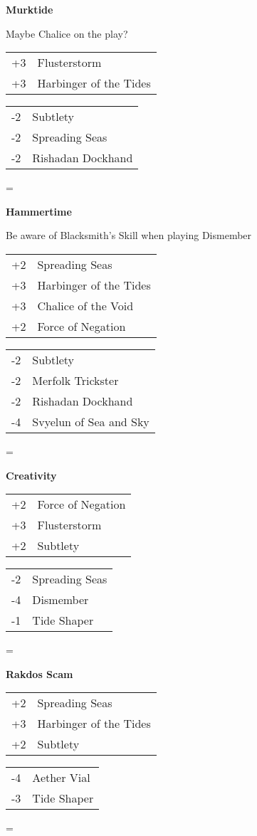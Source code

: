 \documentclass[fontsize=12pt,paper=a4]{scrartcl}
\newenvironment{absolutelynopagebreak}
  {\par\nobreak\vfil\penalty0\vfilneg
   \vtop\bgroup}
  {\par\xdef\tpd{\the\prevdepth}\egroup
   \prevdepth=\tpd}
\newenvironment{decklist}{%
    \begin{tabular}{>{\hspace{-4pt}}r<{\hspace{-3pt}}>{\hspace{-3pt}}l<{\hspace{-4pt}}}
    }{%
    \end{tabular}
    \par
}
\newcommand{\card}[2]{#1 & #2\\}
\newenvironment{sideboardguide}{%
    \newpage
    \begin{multicols}{4}
        \begin{small}
        }{%
        \end{small}
    \end{multicols}
}
\newenvironment{matchup}[1]{%
    \begin{absolutelynopagebreak}
        \textbf{#1}\par
    }{%
    \end{absolutelynopagebreak}
    \par\vspace{2em}
}
\newenvironment{notes}{%
}{%
    \par
}
\begin{document}
\begin{sideboardguide}
    \begin{matchup}{Murktide}
        Maybe Chalice on the play?
        \begin{decklist}
            \card{+3}{Flusterstorm}
            \card{+3}{Harbinger of the Tides}
        \end{decklist}
        \begin{decklist}
            \card{-2}{Subtlety}
            \card{-2}{Spreading Seas}
            \card{-2}{Rishadan Dockhand}
        \end{decklist}
    \end{matchup}
    \begin{matchup}{Hammertime}
        \begin{notes}
            Be aware of Blacksmith's Skill when playing Dismember
        \end{notes}
        \begin{decklist}
            \card{+2}{Spreading Seas}
            \card{+3}{Harbinger of the Tides}
            \card{+3}{Chalice of the Void}
            \card{+2}{Force of Negation}
        \end{decklist}
        \begin{decklist}
            \card{-2}{Subtlety}
            \card{-2}{Merfolk Trickster}
            \card{-2}{Rishadan Dockhand}
            \card{-4}{Svyelun of Sea and Sky}
        \end{decklist}
    \end{matchup}
    \begin{matchup}{Creativity}
        \begin{decklist}
            \card{+2}{Force of Negation}
            \card{+3}{Flusterstorm}
            \card{+2}{Subtlety}
        \end{decklist}
        \begin{decklist}
            \card{-2}{Spreading Seas}
            \card{-4}{Dismember}
            \card{-1}{Tide Shaper}
        \end{decklist}
    \end{matchup}
    \begin{matchup}{Rakdos Scam}
        \begin{decklist}
            \card{+2}{Spreading Seas}
            \card{+3}{Harbinger of the Tides}
            \card{+2}{Subtlety}
        \end{decklist}
        \begin{decklist}
            \card{-4}{Aether Vial}
            \card{-3}{Tide Shaper}

\end{decklist}
\end{matchup}
\end{sideboardguide}
\end{document}

